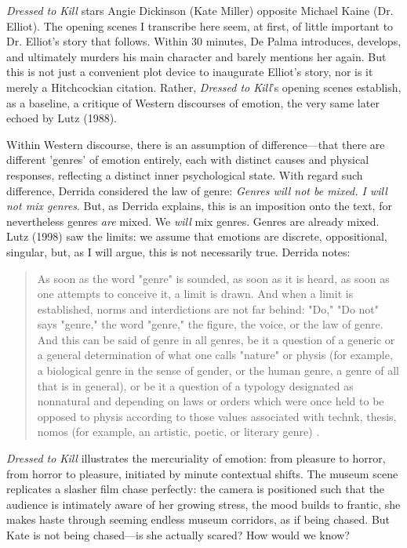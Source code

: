 \documentclass[letterpaper,12pt]{turabian-researchpaper}
\begin{document}
\textit{Dressed to Kill} stars Angie Dickinson (Kate Miller) opposite Michael Kaine (Dr. Elliot). The opening scenes I transcribe here seem, at first, of little important to Dr. Elliot's story that follows. Within 30 minutes, De Palma introduces, develops, and ultimately murders his main character and barely mentions her again.  But this is not just a convenient plot device to inaugurate Elliot's story, nor is it merely a Hitchcockian citation. Rather, \textit{Dressed to Kill}'s opening scenes establish, as a baseline, a critique of Western discourses of emotion, the very same later echoed by Lutz (1988). 

Within Western discourse, there is an assumption of difference---that there are different 'genres' of emotion entirely, each with distinct causes and physical responses, reflecting a distinct inner psychological state. With regard such difference, Derrida considered the law of genre: \textit{Genres will not be mixed. I will not mix genres}. But, as Derrida explains, this is an imposition onto the text, for nevertheless genres \textit{are} mixed. We \textit{will} mix genres. Genres are already mixed. Lutz (1998) saw the limits: we assume that emotions are discrete, oppositional, singular, but, as I will argue, this is not necessarily true. Derrida notes:
\begin{quotation}
\noindent As soon as the word "genre" is sounded, as soon as it is heard, as soon as one attempts to conceive it, a limit is drawn.  And when a limit is established, norms and interdictions are not far behind: "Do," "Do not" says "genre," the word "genre," the figure, the voice, or the law of genre. And this can be said of genre in all genres, be it a question of a generic or a general determination of what one calls "nature" or physis (for example, a biological genre in the sense of gender, or the human genre, a genre of all that is in general), or be it a question of  a typology designated as nonnatural and depending on laws or orders which were once held to be opposed to physis according to those values associated with technk, thesis, nomos (for example, an artistic, poetic, or literary genre) \autocite[56]{derrida_law_1980}.
\end{quotation}
\noindent \textit{Dressed to Kill} illustrates the mercuriality of emotion: from pleasure to horror, from horror to pleasure, initiated by minute contextual shifts. The museum scene replicates a slasher film chase perfectly: the camera is positioned such that the audience is intimately aware of her growing stress, the mood builds to frantic, she makes haste through seeming endless museum corridors, as if being chased. But Kate is not being chased---is she actually scared? How would we know?
\end{document}
